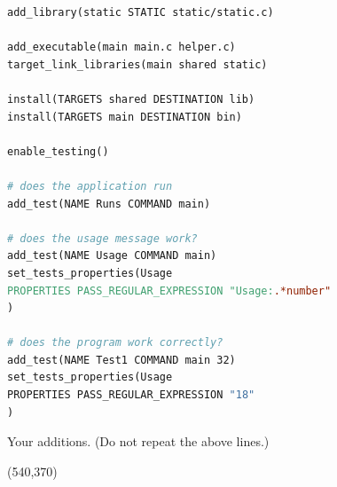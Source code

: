 \documentclass[10pt]{article}
\begin{document}
\begin{enumerate}
\begin{enumerate}
\begin{lstlisting}[language=make]
add_library(static STATIC static/static.c)

add_executable(main main.c helper.c)
target_link_libraries(main shared static)

install(TARGETS shared DESTINATION lib)
install(TARGETS main DESTINATION bin)

enable_testing()

# does the application run
add_test(NAME Runs COMMAND main)

# does the usage message work?
add_test(NAME Usage COMMAND main)
set_tests_properties(Usage
PROPERTIES PASS_REGULAR_EXPRESSION "Usage:.*number"
)

# does the program work correctly?
add_test(NAME Test1 COMMAND main 32)
set_tests_properties(Usage
PROPERTIES PASS_REGULAR_EXPRESSION "18"
)

\end{lstlisting}
\else
Your additions. (Do not repeat the above lines.)

\hspace*{-0.4in}\framebox(540,370){}

\fi
\end{enumerate}
	
\end{enumerate}
\end{document}
